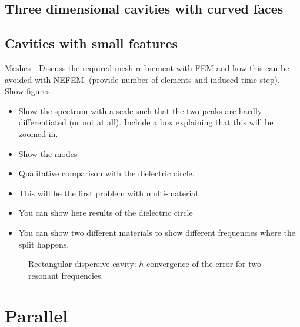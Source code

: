 \clearpage
\subsection{Three dimensional cavities with curved faces}

\clearpage
\subsection{Cavities with small features}
Meshes
- Discuss the required mesh refinement with FEM and how this can be avoided with NEFEM. (provide number of elements and induced time step).
Show figures.
\begin{itemize}
\item Show the spectrum with a scale such that the two peaks are hardly differentiated (or not at all). Include a box explaining that this will be zoomed in.
\item Show the modes
\item Qualitative comparison with the dielectric circle.
\item This will be the first problem with multi-material.
\item You can show here results of the dielectric circle 
\item You can show two different materials to show different frequencies where the split happens.
\end{itemize}

\begin{figure}[!ht]
	\centering
{}
	\caption{Rectangular dispersive cavity: $h$-convergence of the error for two resonant frequencies.}
	\label{fig:rectangle2Ddispersive_Convergence}
\end{figure}
\section{Parallel}
